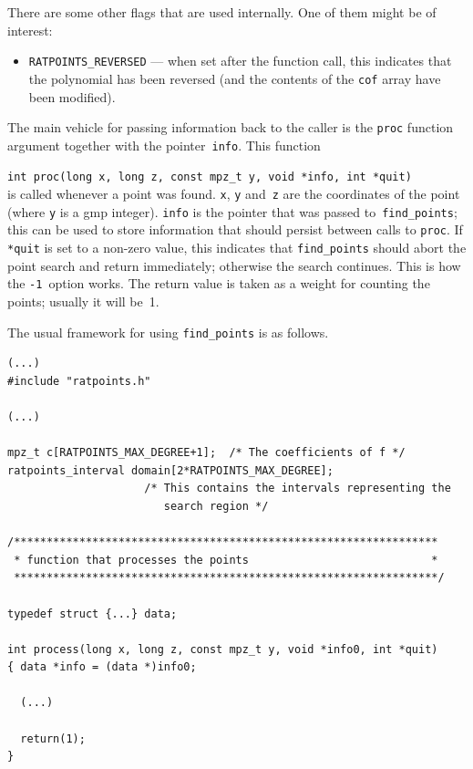 \documentclass[12pt,a4paper,oneside]{amsart}
\begin{document}
There are some other flags that are used internally. One of them might be
of interest:
\begin{itemize}
  \item \texttt{RATPOINTS\_REVERSED} --- when set after the function call,
        this indicates that the polynomial has been reversed (and the
        contents of the \texttt{cof} array have been modified).
\end{itemize}

The main vehicle for passing information back to the caller is the
\texttt{proc} function argument together with the pointer~\texttt{info}.
This function \\
\strut\quad\verb+int proc(long x, long z, const mpz_t y, void *info, int *quit)+ \\
is called whenever a point was found. \texttt{x}, \texttt{y} and~\texttt{z} are
the coordinates of the point (where \texttt{y} is a gmp integer).
\texttt{info} is the pointer that was passed to~\texttt{find\_points}; this
can be used to store information that should persist between calls
to \texttt{proc}. If \texttt{*quit} is set to a non-zero value, this indicates
that \texttt{find\_points} should abort the point search and return immediately;
otherwise the search continues. This is how the \verb+-1+~option works.
The return value is taken as a weight
for counting the points; usually it will be~1.

The usual framework for using \texttt{find\_points} is as follows.

\begin{verbatim}
(...)
#include "ratpoints.h"

(...)

mpz_t c[RATPOINTS_MAX_DEGREE+1];  /* The coefficients of f */
ratpoints_interval domain[2*RATPOINTS_MAX_DEGREE];
                     /* This contains the intervals representing the
                        search region */

/*****************************************************************
 * function that processes the points                            *
 *****************************************************************/

typedef struct {...} data;

int process(long x, long z, const mpz_t y, void *info0, int *quit)
{ data *info = (data *)info0;

  (...)

  return(1);
}
\end{verbatim}
\end{document}
